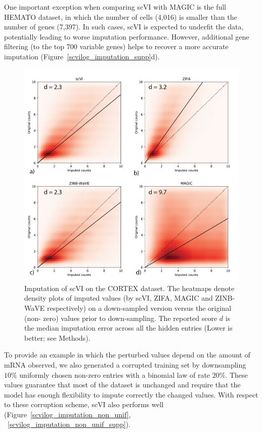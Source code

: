 One important exception when comparing scVI with MAGIC is the full HEMATO dataset, in which the number of cells (4,016) is smaller than the number of genes (7,397). In such cases, scVI is expected to underfit the data, potentially leading to worse imputation performance. However, additional gene filtering (to the top 700 variable genes) helps to recover a more accurate imputation (Figure~\ref{scvilog_imputation_supp}d).

\begin{figure}[p]
\centering
\includegraphics[width=\textwidth]{figures/Figure-3.png}
\caption[Imputation of scVI on the CORTEX dataset]{Imputation of scVI on the CORTEX dataset. The heatmaps denote density plots of imputed values (by scVI, ZIFA, MAGIC and ZINB-WaVE respectively) on a down-sampled version versus the original (non- zero) values prior to down-sampling. The reported score $d$ is the median imputation error across all the hidden entries (Lower is better; see Methods).}
\label{scviimpute_panel}
\end{figure}

To provide an example in which the perturbed values depend on the amount of mRNA observed, we also generated a corrupted training set by downsampling $10\%$ uniformly chosen non-zero entries with a binomial law of rate $20\%$. These values guarantee that most of the dataset is unchanged and require that the model has enough flexibility to impute correctly the changed values. With respect to these corruption scheme, scVI also performs well (Figure~\ref{scvilog_imputation_non_unif}, ~\ref{scvilog_imputation_non_unif_supp}).

